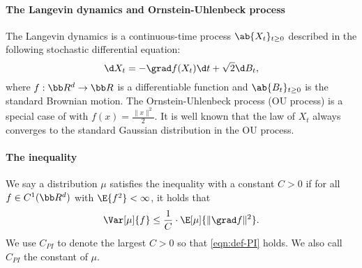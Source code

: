 \documentclass[11pt,a4paper]{article}
\begin{document}





\paragraph{The Langevin dynamics and Ornstein-Uhlenbeck process}
The Langevin dynamics is a continuous-time process $\ab\{X_t\}_{t\geq 0}$ described in the following stochastic differential equation:
\begin{equation}
    \d X_t = - \grad f(X_t)\d t + \sqrt{2}\d B_t, \label{eq:LD}
\end{equation}
where $f:\bb R^d\to \bb R$ is a differentiable function and $\ab\{B_t\}_{t\geq 0}$ is the standard Brownian motion. The Ornstein-Uhlenbeck process (OU process) is a special case of  with $f(x) = \frac{\|x\|^2}{2}$. It is well known that the law of $X_t$ always converges to the standard Gaussian distribution in the OU process.

\paragraph{The \Poincare inequality}
We say a distribution $\mu$ satisfies the \Poincare inequality with a constant $C>0$ if for all $f\in C^1(\bb R^d)$ with $\E{f^2}< \infty$, it holds that
\begin{equation}\label{eqn:def-PI}
    \Var[\mu]{f} \le \frac{1}{C}\cdot \E[\mu]{\|\grad f\|^2}.
\end{equation}
We use $C_{\!{PI}}$ to denote the largest $C>0$ so that \eqref{eqn:def-PI} holds. We also call $C_{\!{PI}}$ the \Poincare constant of $\mu$. 


\end{document}

